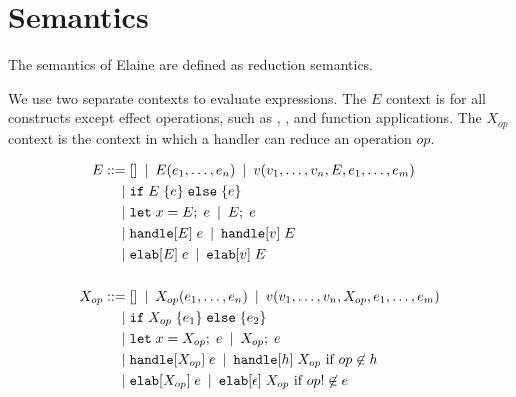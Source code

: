 \section{Semantics}\label{sec:semantics}

The semantics of Elaine are defined as reduction semantics.

We use two separate contexts to evaluate expressions. The $E$ context is for all constructs except effect operations, such as , , and function applications. The $X_{op}$ context is the context in which a handler can reduce an operation $op$.

\begin{align*}
    E
        \mathbin{\;::=\;} & [] \mathbin{\;|\;} E(e_1,\dots, e_n) \mathbin{\;|\;} v(v_1,\dots,v_n,E,e_1,\dots,e_m) \\
        \mathbin{\;|\;} & \text{\texttt{if}}\;E\;\{e\}\;\text{\texttt{else}}\;\{e\}\; \\
        \mathbin{\;|\;} & \text{\texttt{let}}\;x = E;\;e \mathbin{\;|\;} E;\;e\\
        \mathbin{\;|\;} & \text{\texttt{handle}}[E]\;e \mathbin{\;|\;} \text{\texttt{handle}}[v]\;E \\
        \mathbin{\;|\;} & \text{\texttt{elab}}[E]\;e \mathbin{\;|\;} \text{\texttt{elab}}[v]\;E\\
    \\
    X_{op}
        \mathbin{\;::=\;} & [] \mathbin{\;|\;} X_{op}(e_1, \dots, e_n) \mathbin{\;|\;} v(v_1, \dots, v_n, X_{op}, e_1, \dots, e_m) \\
        \mathbin{\;|\;} & \text{\texttt{if}}\;X_{op}\;\{e_1\}\;\text{\texttt{else}}\;\{e_2\}\; \\
        \mathbin{\;|\;} & \text{\texttt{let}}\;x = X_{op};\;e \mathbin{\;|\;} X_{op};\;e \\
        \mathbin{\;|\;} & \text{\texttt{handle}}[X_{op}]\;e \mathbin{\;|\;} \text{\texttt{handle}}[h]\;{X_{op}} \text{ if } op\not\in h \\
        \mathbin{\;|\;} & \text{\texttt{elab}}[X_{op}]\;e \mathbin{\;|\;} \text{\texttt{elab}}[\epsilon]\;X_{op} \text{ if } op! \not\in e
\end{align*}



